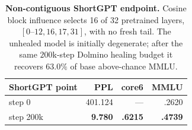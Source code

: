 \begin{table}[t]
\centering
\small
\setlength{\tabcolsep}{4pt}
\begin{tabular}{@{}lrrr@{}}
\toprule
\textbf{ShortGPT point} & \textbf{PPL} & \textbf{core6} & \textbf{MMLU} \\
\midrule
step 0 & 401.124 & --- & .2620 \\
step 200k & \textbf{9.780} & \textbf{.6215} & \textbf{.4739} \\
\bottomrule
\end{tabular}
\caption{\textbf{Non-contiguous ShortGPT endpoint.} Cosine block influence
selects 16 of 32 pretrained layers, $[0\text{--}12,16,17,31]$, with no fresh
tail. The unhealed model is initially degenerate; after the same $200$k-step
Dolmino healing budget it recovers $63.0\%$ of base above-chance MMLU.}
\label{tab:app-shortgpt}
\end{table}
